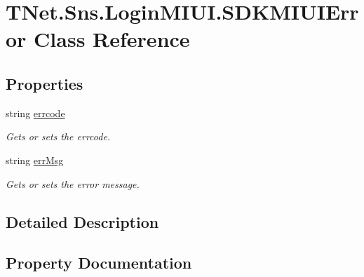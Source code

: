\hypertarget{class_t_net_1_1_sns_1_1_login_m_i_u_i_1_1_s_d_k_m_i_u_i_error}{}\section{T\+Net.\+Sns.\+Login\+M\+I\+U\+I.\+S\+D\+K\+M\+I\+U\+I\+Error Class Reference}
\label{class_t_net_1_1_sns_1_1_login_m_i_u_i_1_1_s_d_k_m_i_u_i_error}


 


\subsection*{Properties}
\begin{DoxyCompactItemize}
\item 
string \mbox{\hyperlink{class_t_net_1_1_sns_1_1_login_m_i_u_i_1_1_s_d_k_m_i_u_i_error_ad8f2aa31ac78570f338f0c4698427abb}{errcode}}
\begin{DoxyCompactList}\small\item\em Gets or sets the errcode. \end{DoxyCompactList}\item 
string \mbox{\hyperlink{class_t_net_1_1_sns_1_1_login_m_i_u_i_1_1_s_d_k_m_i_u_i_error_a661b0cd49ea7ea351d12fc3e4febf756}{err\+Msg}}
\begin{DoxyCompactList}\small\item\em Gets or sets the error message. \end{DoxyCompactList}\end{DoxyCompactItemize}


\subsection{Detailed Description}




\subsection{Property Documentation}
\mbox{\label{class_t_net_1_1_sns_1_1_login_m_i_u_i_1_1_s_d_k_m_i_u_i_error_ad8f2aa31ac78570f338f0c4698427abb}} 
